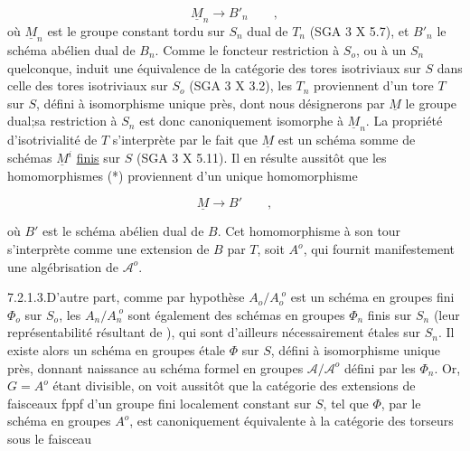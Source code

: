 \begin{equation}\tag{*}
\underline{M}_n \longrightarrow B'_n \qquad ,
\end{equation}
où $\underline{M}_n$ est le groupe constant tordu sur $S_n$ dual de $T_n$ (SGA 3 X 5.7), et $B'_n$ le schéma abélien dual de $B_n$. Comme le foncteur restriction à $S_o$, ou à un $S_n$ quelconque, induit une équivalence de la catégorie des tores isotriviaux sur $S$ dans celle des tores isotriviaux sur $S_o$ (SGA 3 X 3.2), les $T_n$ proviennent d'un tore $T$ sur $S$, défini à isomorphisme unique près, dont nous désignerons par $\underline{M}$ le groupe dual;sa restriction à $S_n$ est donc canoniquement isomorphe à $\underline{M}_n$. La propriété d'isotrivialité de $T$ s'interprète par le fait que $\underline{M}$ est un schéma somme de schémas $\underline{M}^i$ \underline{finis} sur $S$ (SGA 3 X 5.11). Il en résulte aussitôt que les homomorphismes (*) proviennent d'un unique homomorphisme

\begin{equation}\tag{**}
\underline{M} \longrightarrow B' \qquad ,
\end{equation}


où $B'$ est le schéma abélien dual de $B$. Cet homomorphisme à son tour s'interprète comme une extension de $B$ par $T$, soit $A^{o}$, qui fournit manifestement une algébrisation de $\mathcal{A}^{o}$.

7.2.1.3.\quad D'autre part, comme par hypothèse $A_{o}/A_{o}^{\;o}$ est un schéma en groupes fini $\Phi_{o}$ sur $S_o$, les $A_{n}/A_{n}^{\;o}$ sont également des schémas en groupes $\Phi_{n}$ finis sur $S_n$ (leur représentabilité résultant de \hspace{3cm}), qui sont d'ailleurs nécessairement étales sur $S_n$. Il existe alors un schéma en groupes étale $\Phi$ sur $S$, défini à isomorphisme unique près, donnant naissance au schéma formel en groupes $\mathcal{A}/\mathcal{A}^{o}$ défini par les $\Phi_{n}$. Or, $G = A^{o}$ étant divisible, on voit aussitôt que la catégorie des extensions de faisceaux fppf d'un groupe fini localement constant sur $S$, tel que $\Phi$, par le schéma en groupes $A^{o}$, est canoniquement équivalente à la catégorie des torseurs sous le faisceau

